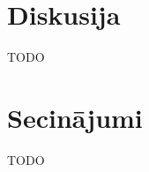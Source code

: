 \documentclass{ludis} %
\begin{document}
\chapter{Diskusija}
TODO
\chapter{Secinājumi}
TODO


\printbibliography
\end{document}
